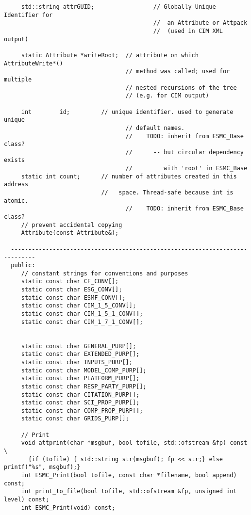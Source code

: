 \begin{verbatim}
     std::string attrGUID;                 // Globally Unique Identifier for
                                           //  an Attribute or Attpack
                                           //  (used in CIM XML output)
 
     static Attribute *writeRoot;  // attribute on which AttributeWrite*()
                                   // method was called; used for multiple
                                   // nested recursions of the tree
                                   // (e.g. for CIM output)
 
     int        id;         // unique identifier. used to generate unique
                                   // default names.
                                   //    TODO: inherit from ESMC_Base class?
                                   //      -- but circular dependency exists
                                   //         with 'root' in ESMC_Base
     static int count;      // number of attributes created in this address
                            //   space. Thread-safe because int is atomic.
                                   //    TODO: inherit from ESMC_Base class?
     // prevent accidental copying
     Attribute(const Attribute&);
 
  -----------------------------------------------------------------------------
  public:
     // constant strings for conventions and purposes
     static const char CF_CONV[];
     static const char ESG_CONV[];
     static const char ESMF_CONV[];
     static const char CIM_1_5_CONV[];
     static const char CIM_1_5_1_CONV[];
     static const char CIM_1_7_1_CONV[];
 
 
     static const char GENERAL_PURP[];
     static const char EXTENDED_PURP[];
     static const char INPUTS_PURP[];
     static const char MODEL_COMP_PURP[];
     static const char PLATFORM_PURP[];
     static const char RESP_PARTY_PURP[];
     static const char CITATION_PURP[];
     static const char SCI_PROP_PURP[];
     static const char COMP_PROP_PURP[];
     static const char GRIDS_PURP[];
 
     // Print
     void attprint(char *msgbuf, bool tofile, std::ofstream &fp) const \
       {if (tofile) { std::string str(msgbuf); fp << str;} else printf("%s", msgbuf);}
     int ESMC_Print(bool tofile, const char *filename, bool append) const;
     int print_to_file(bool tofile, std::ofstream &fp, unsigned int level) const;
     int ESMC_Print(void) const;
 

\end{verbatim}
